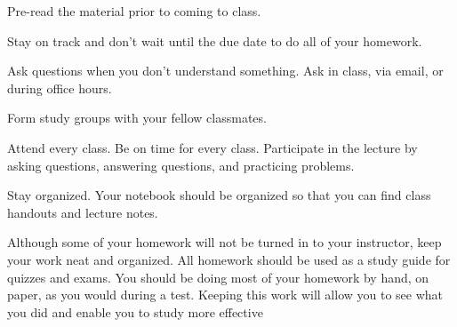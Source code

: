 \begin{outline}

	\1  Pre-read the material prior to coming to class.

	\1 Stay on track and don't wait until the due date to do all of your homework.

	\1  Ask questions when you don't understand something. Ask in class, via email, or during office hours.

	\1 Form study groups with your fellow classmates.

	\1  Attend every class. Be on time for every class. Participate in the lecture by asking questions, answering questions, and practicing problems.

	\1 Stay organized. Your notebook should be organized so that you can find class handouts and lecture notes.

	\1  Although some of your homework will not be turned in to your instructor, keep your work neat and organized. All homework should be used as a study guide for quizzes and exams. You should be doing most of your homework by hand, on paper, as you would during a test. Keeping this work will allow you to see what you did and enable you to study more effective

\end{outline}
